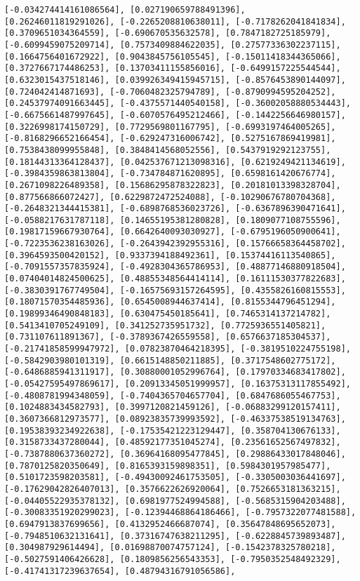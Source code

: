 \documentclass[11pt]{article}
\begin{document}
\begin{Verbatim}[commandchars=\\\{\}]
[-0.034274414161086564], [0.027190659788491396], [0.26246011819291026], [-0.2265208810638011], [-0.7178262041841834], [0.3709651034364559], [-0.690670535632578], [0.7847182725185979], [-0.6099459075209714], [0.7573409884622035], [0.27577336302237115], [0.1664756401672922], [0.9043845756105545], [-0.15011418344365066], [0.3727667174486253], [0.13703411155856016], [-0.6499157225544544], [0.6323015437518146], [0.039926349415945715], [-0.8576453890144097], [0.724042414871693], [-0.7060482325794789], [-0.8790994595204252], [0.24537974091663445], [-0.4375571440540158], [-0.36002058880534443], [-0.6675661487997645], [-0.6070576495212466], [-0.1442256646980157], [0.3226998174150729], [0.7729569801167795], [-0.6993197464005265], [-0.8168296652166454], [-0.629247316006742], [0.5275167869419981], [0.7538438099955848], [0.3848414568052556], [0.5437919292123755], [0.18144313364128437], [0.042537671213098316], [0.6219249421134619], [-0.3984359863813804], [-0.734784871620895], [0.6598161420676774], [0.2671098226489358], [0.15686295878322823], [0.20181013398328704], [0.877566866072427], [0.6229872472524088], [-0.10290676780704368], [-0.2648321344415381], [-0.6898768536023726], [-0.6367896390471641], [-0.0588217631787118], [0.14655195381280828], [0.1809077108755596], [0.19817159667930764], [0.6642640093030927], [-0.6795196050900641], [-0.7223536238163026], [-0.2643942392955316], [0.15766658364458702], [0.3964593500420152], [0.9337394188492361], [0.15374416113540865], [-0.7091557357835924], [-0.4928304365786953], [0.48877146880918504], [0.07404014824500625], [0.48855348564414114], [0.16111530377822683], [-0.3830391767749504], [-0.16575693157264595], [0.4355826160815553], [0.18071570354485936], [0.6545008944637414], [0.8155344796451294], [0.19899346490848183], [0.630475450185641], [0.7465314137214782], [0.5413410705249109], [0.341252735951732], [0.7725936551405821], [0.731107611891367], [-0.3789367426559558], [0.6576637185304537], [-0.21741858599947972], [0.07823870464218395], [-0.3819510224755198], [-0.5842903980101319], [0.6615148850211885], [0.3717548602775172], [-0.6486885941311917], [0.30880001052996764], [0.17970334683417802], [-0.05427595497869617], [0.20913345051999957], [0.16375313117855492], [-0.4808781994348059], [-0.7404365704657704], [0.6847686055467753], [0.1024883434582793], [0.3997120821459126], [-0.06883299120157411], [0.3607366812973577], [0.08923835739993592], [-0.46337538519134763], [0.19538393234922638], [-0.17535421223129447], [0.358704130676133], [0.3158733437280044], [0.48592177351045274], [0.23561652567497832], [-0.7387880637360272], [0.36964168095477845], [0.29886433017848046], [0.7870125820350649], [0.8165393159898351], [0.5984301957985477], [0.5101723598203581], [-0.49430092461753505], [-0.3305003036441697], [-0.17629042826407013], [0.3576622626920064], [0.7526653181363215], [-0.04405522935378132], [0.6981977524994588], [-0.5685315904203488], [-0.30083351920299023], [-0.12394468864186466], [-0.7957322077481588], [0.6947913837699656], [0.4132952466687074], [0.35647848695652073], [-0.7948510632131641], [0.37316747638211295], [-0.6228845739893487], [0.304987929614494], [0.01698870074757124], [-0.1542378325780218], [-0.5027591406426628], [0.1809856256543353], [-0.7950352548492329], [-0.41741317239637654], [0.48794316791056586], 
\end{Verbatim}
\end{document}

